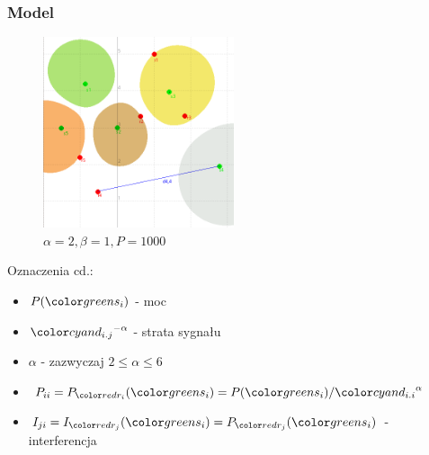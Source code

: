 \documentclass[polish, t,10pt]{beamer}
\begin{document}
    \begin{frame}
        \frametitle{Model}
        \begin{figure}
            \includegraphics[width=0.5\textwidth]{pictures/model-diagram1.png}
            \caption{$\alpha=2, \beta=1, P=1000$}
        \end{figure}
        Oznaczenia cd.:
        \begin{itemize}
            \item $P(\si)$ - moc
            \item $\dij^{-\alpha}$ - strata sygnału
            \item $\alpha$ - zazwyczaj $2 \le \alpha \leq 6$
            \item $P_{ii} = P_{\ri}(\si) = P(\si) / \dii^\alpha$
            \item $I_{ji} = I_{\rj}(\si) = P_{\rj}(\si)$ - interferencja
        \end{itemize}
    \end{frame}
\end{document}
